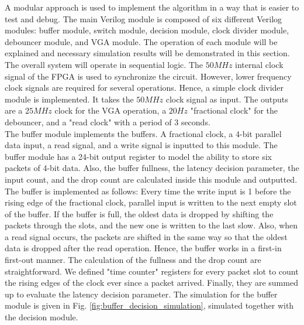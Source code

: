 \documentclass[journal,twoside]{IEEEtran}
\begin{document}
A modular approach is used to implement the algorithm in a way that is easier to test and debug. The main Verilog module is composed of six different Verilog modules: buffer module, switch module, decision module, clock divider module, debouncer module, and VGA module. The operation of each module will be explained and necessary simulation results will be demonstrated in this section.\\

\indent The overall system will operate in sequential logic. The $50MHz$ internal clock signal of the FPGA is used to synchronize the circuit. However, lower frequency clock signals are required for several operations. Hence, a simple clock divider module is implemented. It takes the $50MHz$ clock signal as input. The outputs are a $25MHz$ clock for the VGA operation, a $20Hz$ "fractional clock" for the debouncer, and a "read clock" with a period of 3 seconds.\\

\indent The buffer module implements the buffers. A fractional clock, a 4-bit parallel data input, a read signal, and a write signal is inputted to this module. The buffer module has a 24-bit output register to model the ability to store six packets of 4-bit data. Also, the buffer fullness, the latency decision parameter, the input count, and the drop count are calculated inside this module and outputted. The buffer is implemented as follows: Every time the write input is 1 before the rising edge of the fractional clock, parallel input is written to the next empty slot of the buffer. If the buffer is full, the oldest data is dropped by shifting the packets through the slots, and the new one is written to the last slow. Also, when a read signal occurs, the packets are shifted in the same way so that the oldest data is dropped after the read operation. Hence, the buffer works in a first-in first-out manner. The calculation of the fullness and the drop count are straightforward. We defined "time counter" registers for every packet slot to count the rising edges of the clock ever since a packet arrived. Finally, they are summed up to evaluate the latency decision parameter. The simulation for the buffer module is given in Fig. \ref{fig:buffer_decision_simulation}, simulated together with the decision module.\\
\end{document}
